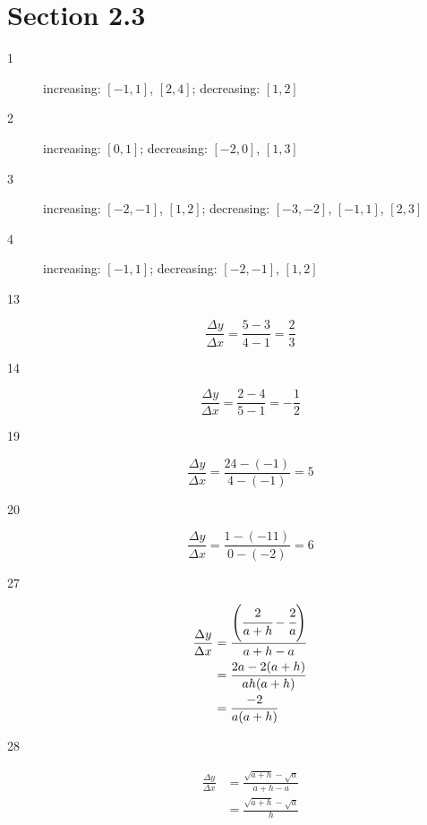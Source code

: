 \documentclass{exam}
\begin{document}
  \pagebreak

  \section{Section 2.3}

  \begin{description}

    \item[1] increasing: $[-1, 1]$, $[2, 4]$; decreasing: $[1, 2]$

    \item[2] increasing: $[0, 1]$; decreasing: $[-2, 0]$, $[1, 3]$ 

    \item[3] increasing: $[-2, -1]$, $[1, 2]$; decreasing: $[-3, -2]$, $[-1, 1]$, $[2, 3]$ 

    \item[4] increasing: $[-1, 1]$; decreasing: $[-2, -1]$, $[1, 2]$ 

    \item[13]
      \[
        \frac{\Delta y}{\Delta x} = \frac{5 - 3}{4 - 1} = \frac{2}{3}
      \]

    \item[14]
      \[
        \frac{\Delta y}{\Delta x} = \frac{2 - 4}{5 - 1} = -\frac{1}{2}
      \]

    \item[19]
      \[
        \frac{\Delta y}{\Delta x} = \frac{24 - (-1)}{4 - (-1)} = 5
      \]

    \item[20]
      \[
        \frac{\Delta y}{\Delta x} = \frac{1 - (-11)}{0 - (-2)} = 6
      \]

    \item[27]
      \begin{align*}
        \frac{\Delta y}{\Delta x} &= \frac{\left( \cfrac{2}{a + h} - \cfrac{2}{a} \right)}{a + h - a} \\
          &= \frac{2a - 2(a + h)}{ah(a + h)} \\
          &= \frac{-2}{a(a + h)} \\
      \end{align*}

    \item[28]
      \begin{align*}
        \frac{\Delta y}{\Delta x} &= \frac{\sqrt{a + h} - \sqrt{a}}{a + h - a} \\
          &= \frac{\sqrt{a + h} - \sqrt{a}}{h} \\
      \end{align*}


\end{description}
\end{document}
